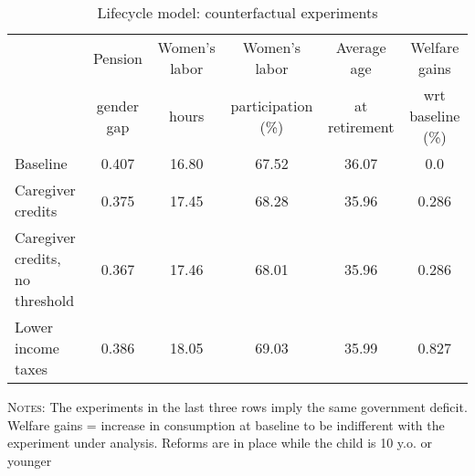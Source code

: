 \begin{table}[htbp]\begin{threeparttable}\caption{Lifecycle model: counterfactual experiments}\label{table:experiments}\centering\footnotesize\begin{tabular}{lccccc} \toprule & Pension & Women's labor & Women's labor & Average age &  Welfare gains  \\&gender gap &hours &  participation  (\%) & at retirement  & wrt baseline (\%)  \\\midrule    Baseline                                   &0.407&16.80&67.52&36.07& 0.0\\ Caregiver credits                          &0.375&17.45&68.28&35.96&0.286\\ Caregiver credits, no threshold            &0.367&17.46&68.01&35.96&0.286\\ Lower income taxes                         &0.386&18.05&69.03&35.99&0.827\\ \bottomrule\end{tabular}\begin{tablenotes}[flushleft]\small\item \textsc{Notes:} The experiments in the last three rows imply the same government deficit. Welfare gains = increase in consumption at baseline to be indifferent with the experiment under analysis. Reforms are in place while the child is 10 y.o. or younger\\\end{tablenotes}\end{threeparttable}\end{table}